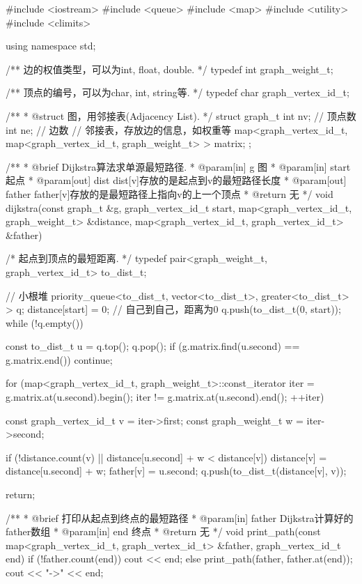 \begin{Codex}[label=al_graph_dijkstra.cpp]
#include <iostream>
#include <queue>
#include <map>
#include <utility>
#include <climits>

using namespace std;

/** 边的权值类型，可以为int, float, double. */
typedef int graph_weight_t;

/** 顶点的编号，可以为char, int, string等. */
typedef char graph_vertex_id_t;

/**
 * @struct 图，用邻接表(Adjacency List).
 */
struct graph_t {
    int nv; // 顶点数
    int ne; // 边数
    // 邻接表，存放边的信息，如权重等
    map<graph_vertex_id_t, map<graph_vertex_id_t, graph_weight_t> > matrix;
};


/**
 * @brief Dijkstra算法求单源最短路径.
 * @param[in] g 图
 * @param[in] start 起点
 * @param[out] dist dist[v]存放的是起点到v的最短路径长度
 * @param[out] father father[v]存放的是最短路径上指向v的上一个顶点
 * @return 无
 */
void dijkstra(const graph_t &g, graph_vertex_id_t start,
        map<graph_vertex_id_t, graph_weight_t> &distance,
        map<graph_vertex_id_t, graph_vertex_id_t> &father) {
    /* 起点到顶点的最短距离. */
    typedef pair<graph_weight_t, graph_vertex_id_t> to_dist_t;

    // 小根堆
    priority_queue<to_dist_t, vector<to_dist_t>, greater<to_dist_t> > q;
    distance[start] = 0;  // 自己到自己，距离为0
    q.push(to_dist_t(0, start));
    while (!q.empty()) {
        const to_dist_t u = q.top(); q.pop();
        if (g.matrix.find(u.second) == g.matrix.end()) continue;

        for (map<graph_vertex_id_t, graph_weight_t>::const_iterator iter =
                g.matrix.at(u.second).begin();
                iter != g.matrix.at(u.second).end(); ++iter) {
            const graph_vertex_id_t v = iter->first;
            const graph_weight_t w = iter->second;

            if (!distance.count(v) || distance[u.second] + w < distance[v]) {
                distance[v] = distance[u.second] + w;
                father[v] = u.second;
                q.push(to_dist_t(distance[v], v));
            }
        }
    }
    return;
}

/**
 * @brief 打印从起点到终点的最短路径
 * @param[in] father Dijkstra计算好的father数组
 * @param[in] end 终点
 * @return 无
 */
void print_path(const map<graph_vertex_id_t, graph_vertex_id_t> &father,
        graph_vertex_id_t end) {
    if (!father.count(end)) {
        cout << end;
    } else {
        print_path(father, father.at(end));
        cout << "->" << end;
    }
}


\end{Codex}
